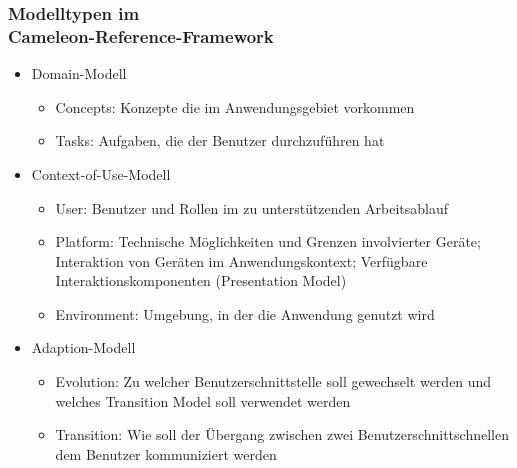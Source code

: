 \documentclass
[
	8pt,		%
	ngerman,	%
	a4paper,	%
	landscape,	%
	final		%
]{extarticle}
\begin{document}
\begin{multicols*}{4}
	\subsubsection{Modelltypen im\\Cameleon-Reference-Framework}
	\begin{itemize}
		\item Domain-Modell
		      \begin{itemize}[nolistsep]
			      \item Concepts: Konzepte die im Anwendungsgebiet vorkommen
			      \item Tasks: Aufgaben, die der Benutzer durchzuführen hat
		      \end{itemize}
		\item Context-of-Use-Modell
		      \begin{itemize}[nolistsep]
			      \item User: Benutzer und Rollen im zu unterstützenden
			            Arbeitsablauf
			      \item Platform: Technische Möglichkeiten und Grenzen
			            involvierter Geräte; Interaktion von Geräten im
			            Anwendungskontext;
			            Verfügbare Interaktionskomponenten (Presentation Model)
			      \item Environment: Umgebung, in der die Anwendung genutzt wird
		      \end{itemize}
		\item Adaption-Modell
		      \begin{itemize}[nolistsep]
			      \item Evolution: Zu welcher Benutzerschnittstelle soll
			            gewechselt werden und welches Transition Model soll
			            verwendet werden
			      \item Transition: Wie soll der Übergang zwischen zwei
			            Benutzerschnittschnellen dem Benutzer kommuniziert
			            werden
		      \end{itemize}
	\end{itemize}
\end{multicols*}
\end{document}
